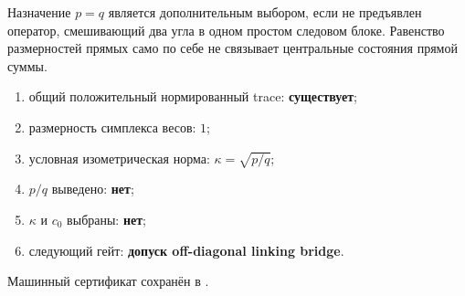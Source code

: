 \begin{nogocriterion}
Назначение $p=q$ является дополнительным выбором, если не предъявлен
оператор, смешивающий два угла в одном простом следовом блоке. Равенство
размерностей прямых само по себе не связывает центральные состояния
прямой суммы.
\end{nogocriterion}

\begin{protocol}\begin{enumerate}
\item общий положительный нормированный trace: \textbf{существует};
\item размерность симплекса весов: \textbf{$1$};
\item условная изометрическая норма: \textbf{$\kappa=\sqrt{p/q}$};
\item $p/q$ выведено: \textbf{нет};
\item $\kappa$ и $c_0$ выбраны: \textbf{нет};
\item следующий гейт: \textbf{допуск off-diagonal linking bridge}.
\end{enumerate}\end{protocol}

Машинный сертификат сохранён в
.